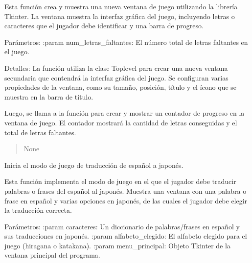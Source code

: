 \documentclass[letterpaper,10pt,spanish]{sphinxmanual}
\begin{document}
\begin{fulllineitems}
\begin{fulllineitems}
\sphinxAtStartPar
Esta función crea y muestra una nueva ventana de juego utilizando la librería Tkinter.
La ventana muestra la interfaz gráfica del juego, incluyendo letras o caracteres
que el jugador debe identificar y una barra de progreso.

\sphinxAtStartPar
Parámetros:
:param num\_letras\_faltantes: El número total de letras faltantes en el juego.

\sphinxAtStartPar
Detalles:
La función utiliza la clase Toplevel para crear una nueva ventana secundaria que
contendrá la interfaz gráfica del juego. Se configuran varias propiedades de la ventana,
como su tamaño, posición, título y el ícono que se muestra en la barra de título.

\sphinxAtStartPar
Luego, se llama a la función  para crear y mostrar un contador de progreso
en la ventana de juego. El contador mostrará la cantidad de letras conseguidas y el total
de letras faltantes.
\begin{quote}\begin{description}
\sphinxAtStartPar
None

\end{description}\end{quote}

\end{fulllineitems}


\begin{fulllineitems}
\label{\detokenize{juego:juego.Juego.espanol_a_japones}}
\pysigstartsignatures
{}
\pysigstopsignatures
\sphinxAtStartPar
Inicia el modo de juego de traducción de español a japonés.

\sphinxAtStartPar
Esta función implementa el modo de juego en el que el jugador debe traducir palabras o frases del
español al japonés. Muestra una ventana con una palabra o frase en español y varias opciones en japonés,
de las cuales el jugador debe elegir la traducción correcta.

\sphinxAtStartPar
Parámetros:
:param caracteres: Un diccionario de palabras/frases en español y sus traducciones en japonés.
:param alfabeto\_elegido: El alfabeto elegido para el juego (hiragana o katakana).
:param menu\_principal: Objeto Tkinter de la ventana principal del programa.


\end{fulllineitems}
\end{fulllineitems}
\end{document}
